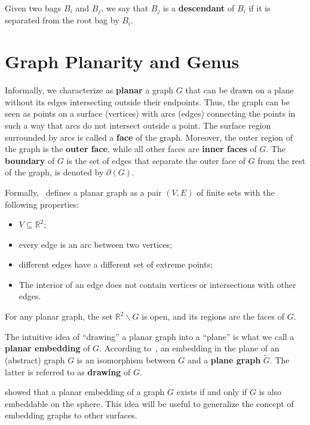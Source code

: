 Given two bags \(B_i\) and \(B_j\), we say that \(B_j\) is a \textbf{descendant} of \(B_i\) if it is separated from the root bag by \(B_i\).

\section{Graph Planarity and Genus}

Informally, we characterize as \textbf{planar} a graph \(G\) that can be drawn on a plane without its edges intersecting outside their endpoints. Thus, the graph can be seen as points on a surface (vertices) with arcs (edges) connecting the points in such a way that arcs do not intersect outside a point. The surface region surrounded by arcs is called a \textbf{face} of the graph. Moreover, the outer region of the graph is the \textbf{outer face}, while all other faces are \textbf{inner faces} of \(G\). The \textbf{boundary} of \(G\) is the set of edges that separate the outer face of \(G\) from the rest of the graph, is denoted by \(\partial(G)\).

Formally,~\cite{Diestel} defines a planar graph as a pair \((V, E)\) of finite sets with the following properties:

\begin{itemize}
    \item \(V \subseteq \mathbb{R}^2\);
    \item every edge is an arc between two vertices;
    \item different edges have a different set of extreme points;
    \item The interior of an edge does not contain vertices or intersections with other edges.
\end{itemize}

For any planar graph, the set \(\mathbb{R}^2 \backslash G\) is open, and its regions are the faces of \(G\).

The intuitive idea of ``drawing'' a planar graph into a ``plane'' is what we call a \textbf{planar embedding} of \(G\). According to~\cite{Diestel}, an embedding in the plane of an (abstract) graph \(G\) is an isomorphism between \(G\) and a \textbf{plane graph} \(\tilde{G}\). The latter is referred to as \textbf{drawing} of \(G\).

\cite{BondyNMurty} showed that a planar embedding of a graph \(G\) exists if and only if \(G\) is also embeddable on the sphere. This idea will be useful to generalize the concept of embedding graphs to other surfaces.

